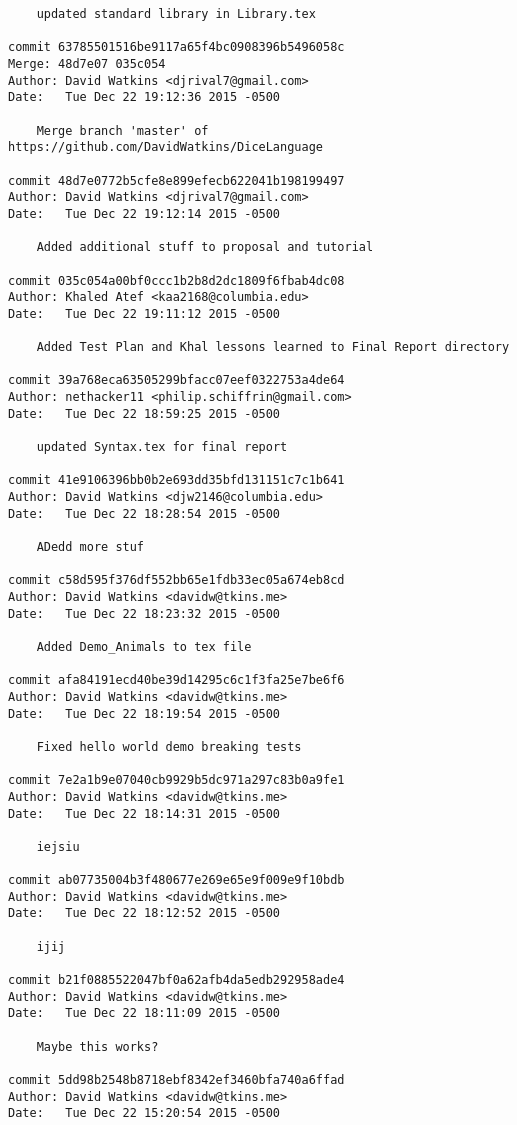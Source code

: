 \begin{verbatim}
    updated standard library in Library.tex

commit 63785501516be9117a65f4bc0908396b5496058c
Merge: 48d7e07 035c054
Author: David Watkins <djrival7@gmail.com>
Date:   Tue Dec 22 19:12:36 2015 -0500

    Merge branch 'master' of https://github.com/DavidWatkins/DiceLanguage

commit 48d7e0772b5cfe8e899efecb622041b198199497
Author: David Watkins <djrival7@gmail.com>
Date:   Tue Dec 22 19:12:14 2015 -0500

    Added additional stuff to proposal and tutorial

commit 035c054a00bf0ccc1b2b8d2dc1809f6fbab4dc08
Author: Khaled Atef <kaa2168@columbia.edu>
Date:   Tue Dec 22 19:11:12 2015 -0500

    Added Test Plan and Khal lessons learned to Final Report directory

commit 39a768eca63505299bfacc07eef0322753a4de64
Author: nethacker11 <philip.schiffrin@gmail.com>
Date:   Tue Dec 22 18:59:25 2015 -0500

    updated Syntax.tex for final report

commit 41e9106396bb0b2e693dd35bfd131151c7c1b641
Author: David Watkins <djw2146@columbia.edu>
Date:   Tue Dec 22 18:28:54 2015 -0500

    ADedd more stuf

commit c58d595f376df552bb65e1fdb33ec05a674eb8cd
Author: David Watkins <davidw@tkins.me>
Date:   Tue Dec 22 18:23:32 2015 -0500

    Added Demo_Animals to tex file

commit afa84191ecd40be39d14295c6c1f3fa25e7be6f6
Author: David Watkins <davidw@tkins.me>
Date:   Tue Dec 22 18:19:54 2015 -0500

    Fixed hello world demo breaking tests

commit 7e2a1b9e07040cb9929b5dc971a297c83b0a9fe1
Author: David Watkins <davidw@tkins.me>
Date:   Tue Dec 22 18:14:31 2015 -0500

    iejsiu

commit ab07735004b3f480677e269e65e9f009e9f10bdb
Author: David Watkins <davidw@tkins.me>
Date:   Tue Dec 22 18:12:52 2015 -0500

    ijij

commit b21f0885522047bf0a62afb4da5edb292958ade4
Author: David Watkins <davidw@tkins.me>
Date:   Tue Dec 22 18:11:09 2015 -0500

    Maybe this works?

commit 5dd98b2548b8718ebf8342ef3460bfa740a6ffad
Author: David Watkins <davidw@tkins.me>
Date:   Tue Dec 22 15:20:54 2015 -0500


\end{verbatim}
